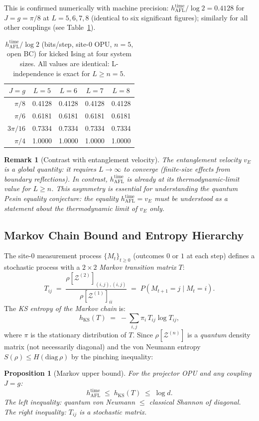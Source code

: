 \documentclass[12pt,a4paper]{article}
\newtheorem{proposition}[theorem]{Proposition}
\newtheorem{remark}[theorem]{Remark}
\begin{document}
This is confirmed numerically with machine precision:
$h_{\mathrm{AFL}}^{\mathrm{time}}/\log 2 = 0.4128$ for $J{=}g{=}\pi/8$
at $L = 5, 6, 7, 8$ (identical to six significant figures);
similarly for all other couplings (see Table~\ref{tab:hafl_l_dep}).

\begin{table}[h!]
\centering
\caption{$h_{\mathrm{AFL}}^{\mathrm{time}}/\log 2$ (bits/step, site-$0$ OPU,
$n=5$, open BC) for kicked Ising at four system sizes.
All values are identical: L-independence is exact for $L \geq n=5$.}
\label{tab:hafl_l_dep}
\begin{tabular}{r|cccc}
\hline
$J=g$ & $L=5$ & $L=6$ & $L=7$ & $L=8$ \\
\hline
$\pi/8$   & 0.4128 & 0.4128 & 0.4128 & 0.4128 \\
$\pi/6$   & 0.6181 & 0.6181 & 0.6181 & 0.6181 \\
$3\pi/16$ & 0.7334 & 0.7334 & 0.7334 & 0.7334 \\
$\pi/4$   & 1.0000 & 1.0000 & 1.0000 & 1.0000 \\
\hline
\end{tabular}
\end{table}

\begin{remark}[Contrast with entanglement velocity]
  The entanglement velocity $v_E$ is a global quantity: it requires
  $L \to \infty$ to converge (finite-size effects from boundary reflections).
  In contrast, $h_{\mathrm{AFL}}^{\mathrm{time}}$ is already at its
  thermodynamic-limit value for $L \geq n$.  This asymmetry is essential
  for understanding the quantum Pesin equality conjecture: the equality
  $h_{\mathrm{AFL}}^{\mathrm{time}} = v_E$ must be understood as a statement
  about the \emph{thermodynamic limit} of $v_E$ only.
\end{remark}

\subsection{Markov Chain Bound and Entropy Hierarchy}
\label{subsec:markov_bound}

The site-0 measurement process $\{M_t\}_{t \geq 0}$ (outcomes $0$ or $1$
at each step) defines a stochastic process with a $2\times 2$
\emph{Markov transition matrix} $T$:
\[
  T_{ij} \;=\; \frac{\rho[\mathcal{Z}^{(2)}]_{(i,j),(i,j)}}
                    {\rho[\mathcal{Z}^{(1)}]_{ii}}
  \;=\; P(M_{t+1}=j \mid M_t = i).
\]
The \emph{KS entropy of the Markov chain} is:
\[
  h_{\mathrm{KS}}(T) \;=\; -\sum_{i,j} \pi_i\, T_{ij}\log T_{ij},
\]
where $\pi$ is the stationary distribution of $T$.
Since $\rho[\mathcal{Z}^{(n)}]$ is a \emph{quantum} density matrix
(not necessarily diagonal) and the von Neumann entropy $S(\rho) \leq
H(\mathrm{diag}\,\rho)$ by the pinching inequality:
\begin{proposition}[Markov upper bound]
  \label{prop:markov_bound}
  For the projector OPU and any coupling $J=g$:
  \[
    h_{\mathrm{AFL}}^{\mathrm{time}}
    \;\leq\; h_{\mathrm{KS}}(T) \;\leq\; \log d.
  \]
  The left inequality: quantum von Neumann $\leq$ classical Shannon of
  diagonal. The right inequality: $T_{ij}$ is a stochastic matrix.
\end{proposition}
\end{document}
